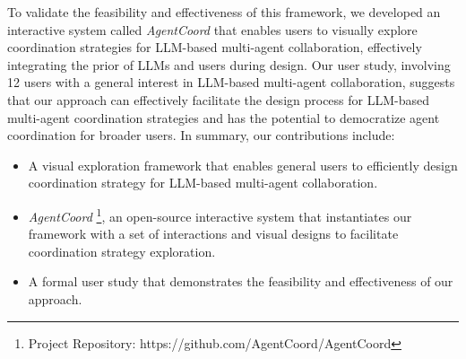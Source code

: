 To validate the feasibility and effectiveness of this framework, we developed an interactive system called \textit{AgentCoord} that enables users to visually explore coordination strategies for LLM-based multi-agent collaboration, effectively integrating the prior of LLMs and users during design. Our user study, involving 12 users with a general interest in LLM-based multi-agent collaboration, suggests that our approach can effectively facilitate the design process for LLM-based multi-agent coordination strategies and has the potential to democratize agent coordination for broader users. In summary, our contributions include:

\begin{itemize}
\item A visual exploration framework that enables general users to efficiently design
coordination strategy for LLM-based multi-agent collaboration.
\item \textit{AgentCoord} \footnote[3]{{Project Repository: https://github.com/AgentCoord/AgentCoord}}, an open-source interactive system that instantiates our framework with a set of interactions and visual designs to facilitate coordination strategy exploration.
\item A formal user study that
demonstrates the feasibility and effectiveness of our approach.
\end{itemize}







